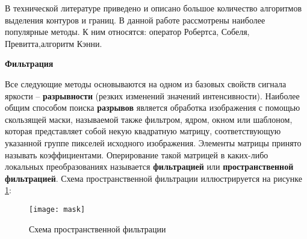 В технической литературе приведено и описано большое количество алгоритмов выделения контуров и границ. В данной работе рассмотрены наиболее популярные методы. К ним относятся: оператор Робертса, Собеля, Превитта,алгоритм Кэнни.
\begin{center}
	\textbf{Фильтрация}
\end{center}
Все следующие методы основываются на одном из базовых свойств сигнала яркости – \textbf{разрывности} (резких изменений значений интенсивности). Наиболее общим способом поиска \textbf{разрывов} является обработка изображения с помощью скользящей маски, называемой также фильтром, ядром, окном или шаблоном, которая представляет собой некую квадратную матрицу, соответствующую указанной группе пикселей исходного изображения. Элементы матрицы принято называть коэффициентами. Оперирование такой матрицей в каких-либо локальных преобразованиях называется \textbf{фильтрацией} или \textbf{пространственной фильтрацией}.    
	Схема пространственной фильтрации иллюстрируется на рисунке \ref{mask}:
	\begin{figure}[H]
		\centering
		\texttt{[image: mask]}
		\caption{Схема пространственной фильтрации}
		\label{mask}
\end{figure}

